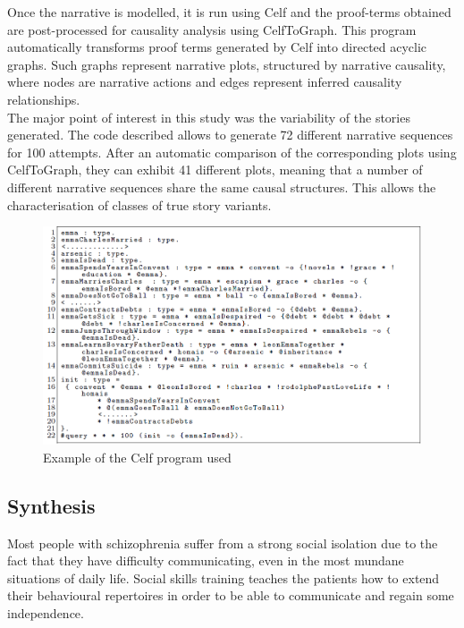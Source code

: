 \documentclass[11pt]{article}
\begin{document}
Once the narrative is modelled, it is run using Celf and the proof-terms obtained are post-processed for causality analysis using CelfToGraph. This program automatically transforms proof terms generated by Celf into directed acyclic graphs. Such graphs represent narrative plots, structured by narrative causality, where nodes are narrative actions and edges represent inferred causality relationships.\\

The major point of interest in this study was the variability of the stories generated. The code described allows to generate 72 different narrative sequences for 100 attempts. After an automatic comparison of the corresponding plots using CelfToGraph, they can exhibit 41 different plots, meaning that a number of different narrative sequences share the same causal structures. This allows the characterisation of classes of true story variants. \\

\begin{figure}[!h]
   	\centerline{\includegraphics[scale=0.6]{./images/celf}}
   	\caption{\label{Figure celf} Example of the Celf program used \citep{Martens13}}
\end{figure}
\newpage
\subsection{Synthesis}
Most people with schizophrenia suffer from a strong social isolation due to the fact that they have difficulty communicating, even in the most mundane situations of daily life. Social skills training teaches the patients how to extend their behavioural repertoires in order to be able to communicate and regain some independence.\\
\end{document}
